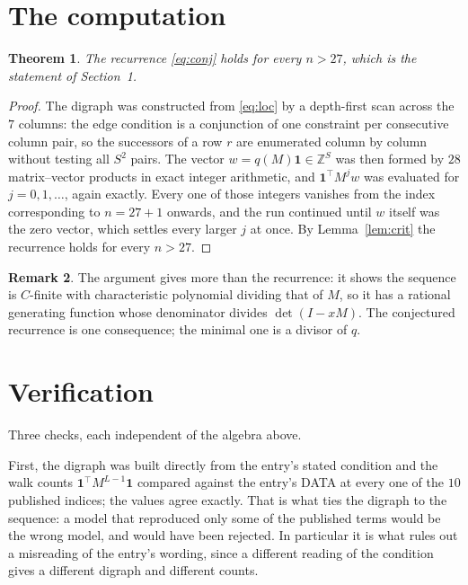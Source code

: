 \documentclass[11pt,a4paper]{article}
\theoremstyle{plain}
\newtheorem{theorem}{Theorem}
\theoremstyle{definition}
\newtheorem{remark}[theorem]{Remark}
\begin{document}
\section{The computation}

\begin{theorem}
The recurrence \eqref{eq:conj} holds for every $n>27$, which is the statement of
Section~1.
\end{theorem}

\begin{proof}
The digraph was constructed from \eqref{eq:loc} by a depth-first scan across the $7$
columns: the edge condition is a conjunction of one constraint per consecutive column
pair, so the successors of a row $r$ are enumerated column by column without testing all
$S^2$ pairs. The vector $w=q(M)\mathbf{1}\in\mathbb{Z}^{S}$ was then formed by $28$
matrix--vector products in exact integer arithmetic, and $\mathbf{1}^{\!\top}M^{j}w$ was
evaluated for $j=0,1,\dots$, again exactly. Every one of those integers vanishes from the
index corresponding to $n=27+1$ onwards, and the run continued until $w$ itself was the
zero vector, which settles every larger $j$ at once. By Lemma~\ref{lem:crit} the recurrence
holds for every $n>27$.
\end{proof}

\begin{remark}
The argument gives more than the recurrence: it shows the sequence is $C$-finite with
characteristic polynomial dividing that of $M$, so it has a rational generating function
whose denominator divides $\det(I-xM)$. The conjectured recurrence is one consequence; the
minimal one is a divisor of $q$.
\end{remark}

\section{Verification}

Three checks, each independent of the algebra above.

First, the digraph was built directly from the entry's stated condition and the walk counts
$\mathbf{1}^{\!\top}M^{L-1}\mathbf{1}$ compared against the entry's DATA at
every one of the $10$ published indices; the values agree exactly. That is what ties
the digraph to the sequence: a model that reproduced only some of the published terms would
be the wrong model, and would have been rejected. In particular it is what rules out a
misreading of the entry's wording, since a different reading of the condition gives a
different digraph and different counts.
\end{document}
